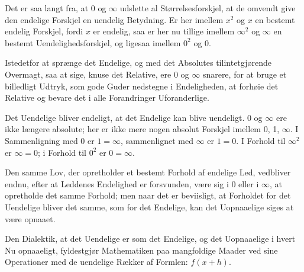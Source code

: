 \documentclass[12pt]{book}
\newcommand{\opage}[1]{\marginnote{\footnotesize\textit{[#1]}}}
\begin{document}
Det er saa langt fra, at 0 og $\infty$ udslette al Størrelsesforskjel, at de
omvendt give den endelige Forskjel en uendelig Betydning. Er her imellem $x^{2}$
og $x$ en bestemt endelig Forskjel, fordi $x$ er endelig, saa er her nu tillige
imellem
\opage{51} $\infty^{2}$ og $\infty$ en bestemt Uendelighedsforskjel, og ligesaa imellem
$0^{2}$ og 0.

Istedetfor at sprænge det Endelige, og med det Absolutes tilintetgjørende
Overmagt, saa at sige, knuse det Relative, ere 0 og $\infty$ snarere, for at bruge
et billedligt Udtryk, som gode Guder nedstegne i Endeligheden, at forhøie det
Relative og bevare det i alle Forandringer Uforanderlige.

Det Uendelige bliver endeligt, at det Endelige kan blive uendeligt. 0 og $\infty$
ere ikke længere absolute; her er ikke mere nogen absolut Forskjel imellem 0, 1,
$\infty$. I Sammenligning med 0 er $1 = \infty$, sammenlignet med $\infty$ er
$1 = 0$. I Forhold til $\infty^{2}$ er $\infty = 0$; i Forhold til $0^{2}$ er
$0 = \infty$.

Den samme Lov, der opretholder et bestemt Forhold af endelige Led, vedbliver
endnu, efter at Leddenes Endelighed er forsvunden, være sig i 0 eller i $\infty$,
at opretholde det samme Forhold; men naar det er beviisligt, at Forholdet for det
Uendelige bliver det samme, som for det Endelige, kan det Uopnaaelige siges at
være opnaaet.

Den Dialektik, at det Uendelige er som det Endelige, og det Uopnaaelige i hvert Nu
opnaaeligt, fyldestgjør Mathematiken paa mangfoldige Maader ved sine Operationer
med de uendelige Rækker af Formlen: $f(x+h)$.
\end{document}
